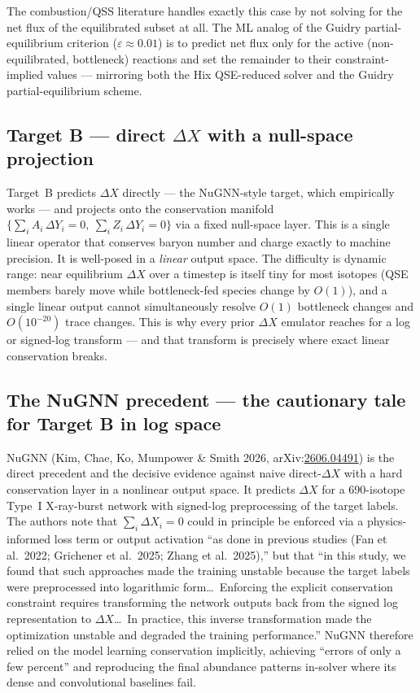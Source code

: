 \documentclass[11pt]{article}
\newcommand{\arxiv}[1]{arXiv:\href{https://arxiv.org/abs/#1}{#1}}
\begin{document}
The combustion/QSS literature handles exactly this case by not solving for the net flux of the equilibrated subset at all. The ML analog of the Guidry partial-equilibrium criterion ($\varepsilon \approx 0.01$) is to predict net flux only for the active (non-equilibrated, bottleneck) reactions and set the remainder to their constraint-implied values --- mirroring both the Hix QSE-reduced solver and the Guidry partial-equilibrium scheme.

\subsection{Target B --- direct \texorpdfstring{$\Delta X$}{DeltaX} with a null-space projection}

Target~B predicts $\Delta X$ directly --- the NuGNN-style target, which empirically works --- and projects onto the conservation manifold $\{\sum_i A_i\,\Delta Y_i = 0,\ \sum_i Z_i\,\Delta Y_i = 0\}$ via a fixed null-space layer. This is a single linear operator that conserves baryon number and charge exactly to machine precision. It is well-posed in a \emph{linear} output space. The difficulty is dynamic range: near equilibrium $\Delta X$ over a timestep is itself tiny for most isotopes (QSE members barely move while bottleneck-fed species change by $O(1)$), and a single linear output cannot simultaneously resolve $O(1)$ bottleneck changes and $O(10^{-20})$ trace changes. This is why every prior $\Delta X$ emulator reaches for a log or signed-log transform --- and that transform is precisely where exact linear conservation breaks.

\subsection{The NuGNN precedent --- the cautionary tale for Target B in log space}

NuGNN (Kim, Chae, Ko, Mumpower \& Smith 2026, \arxiv{2606.04491}) is the direct precedent and the decisive evidence against naive direct-$\Delta X$ with a hard conservation layer in a nonlinear output space. It predicts $\Delta X$ for a 690-isotope Type~I X-ray-burst network with signed-log preprocessing of the target labels. The authors note that $\sum_i \Delta X_i = 0$ could in principle be enforced via a physics-informed loss term or output activation ``as done in previous studies (Fan et al.\ 2022; Grichener et al.\ 2025; Zhang et al.\ 2025),'' but that ``in this study, we found that such approaches made the training unstable because the target labels were preprocessed into logarithmic form\ldots\ Enforcing the explicit conservation constraint requires transforming the network outputs back from the signed log representation to $\Delta X$\ldots\ In practice, this inverse transformation made the optimization unstable and degraded the training performance.'' NuGNN therefore relied on the model learning conservation implicitly, achieving ``errors of only a few percent'' and reproducing the final abundance patterns in-solver where its dense and convolutional baselines fail.
\end{document}
